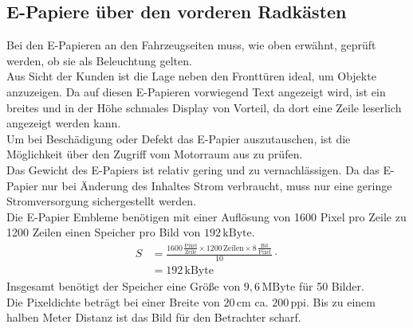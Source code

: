 \subsection{E-Papiere über den vorderen Radkästen}
Bei den E-Papieren an den Fahrzeugseiten muss, wie oben erwähnt, geprüft werden, ob sie als Beleuchtung gelten.\\
Aus Sicht der Kunden ist die Lage neben den Fronttüren ideal, um Objekte anzuzeigen.
Da auf diesen E-Papieren vorwiegend Text angezeigt wird, ist ein breites und in der Höhe schmales Display von Vorteil, da dort eine Zeile leserlich angezeigt werden kann. \\
Um bei Beschädigung oder  Defekt das E-Papier auszutauschen, ist die Möglichkeit über den Zugriff vom Motorraum aus zu prüfen. \\
Das Gewicht des E-Papiers ist relativ gering und zu vernachlässigen.
Da das E-Papier nur bei Änderung des Inhaltes Strom verbraucht, muss nur eine geringe Stromversorgung sichergestellt werden. \\
Die E-Papier Embleme benötigen mit einer Auflösung von 1600 Pixel pro Zeile zu 1200 Zeilen einen Speicher pro Bild von $ 192\,\mathrm{kByte} $.
\begin{align}
	S &= \frac{1600\,\frac{\mathrm{Pixel}}{\mathrm{Zeile}} \times 1200\,\mathrm{Zeilen} \times 8\,\frac{\mathrm{Bit}}{\mathrm{Pixel}}}{10} \cdot \\
	&= 192\,\mathrm{kByte}
\end{align}
Insgesamt benötigt der Speicher eine Größe von $ 9,6\,\mathrm{MByte} $ für 50 Bilder. \\
Die Pixeldichte beträgt bei einer Breite von $ 20\,\mathrm{cm} $ ca. $ 200\,\mathrm{ppi} $. Bis zu einem halben Meter Distanz ist das Bild für den Betrachter scharf.
